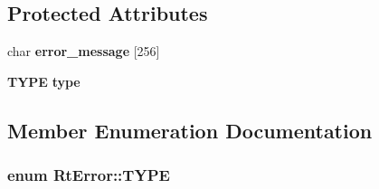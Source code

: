 \subsection*{Protected Attributes}
\begin{CompactItemize}
\item 
char {\bf error\_\-message} [256]
\item 
{\bf TYPE} {\bf type}
\end{CompactItemize}


\subsection{Member Enumeration Documentation}
\subsubsection{\setlength{\rightskip}{0pt plus 5cm}enum Rt\-Error::TYPE}\label{classRtError_s11}


